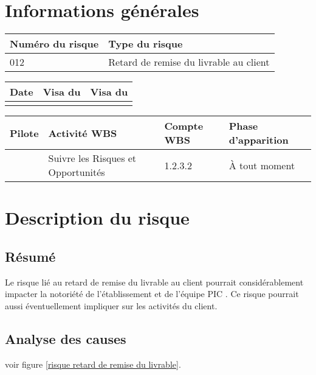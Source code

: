 \section*{Informations générales}
 
\begin{table}[H]
\centering
	\begin{tabularx}{16.8cm}{|X|X|}
	\hline
	\rowcolor{gray!40} Numéro du risque & Type du risque \\
	\hline
	012 & Retard de remise du livrable au client \\
	\hline
	\end{tabularx}
\end{table}

\begin{table}[H]
\centering
	\begin{tabularx}{16.8cm}{|X|X|X|}
	\hline
	\rowcolor{gray!40} Date & Visa du \RQ & Visa du \CP \\
	\hline
	  &  &  \\
	\hline
	\end{tabularx}
\end{table}

\begin{table}[H]
\centering
	\begin{tabularx}{16.8cm}{|X|X|X|X|}
	\hline
	\rowcolor{gray!40} Pilote & Activité WBS & Compte WBS & Phase d'apparition \\
	\hline
	 \Kafui & Suivre les Risques et Opportunités & 1.2.3.2 & À tout moment\\
	\hline
	\end{tabularx}
\end{table}

\section*{Description du risque}

\subsection*{Résumé}
	Le risque lié au retard de remise du livrable au client pourrait considérablement impacter la notoriété de l'établissement et de l'équipe PIC . Ce risque pourrait aussi éventuellement impliquer sur les activités du client.
	
\subsection*{Analyse des causes}
	voir figure \ref{risque retard de remise du livrable}.


